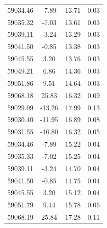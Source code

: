 \begin{longtable}{|c|c|c|c|}
 59034.46 &   -7.89 &       13.71 &          0.03 \\
 59035.32 &   -7.03 &       13.61 &          0.03 \\
 59039.11 &   -3.24 &       13.29 &          0.03 \\
 59041.50 &   -0.85 &       13.38 &          0.03 \\
 59045.55 &    3.20 &       13.76 &          0.03 \\
 59049.21 &    6.86 &       14.36 &          0.03 \\
 59051.86 &    9.51 &       14.64 &          0.03 \\
 59068.18 &   25.83 &       16.32 &          0.09 \\
 59029.09 &  -13.26 &       17.99 &          0.13 \\
 59030.40 &  -11.95 &       16.89 &          0.08 \\
 59031.55 &  -10.80 &       16.32 &          0.05 \\
 59034.46 &   -7.89 &       15.22 &          0.04 \\
 59035.33 &   -7.02 &       15.25 &          0.04 \\
 59039.11 &   -3.24 &       14.70 &          0.04 \\
 59041.50 &   -0.85 &       14.75 &          0.04 \\
 59045.55 &    3.20 &       15.12 &          0.04 \\
 59051.79 &    9.44 &       15.78 &          0.06 \\
 59068.19 &   25.84 &       17.28 &          0.11 \\
\hline
\end{longtable}

